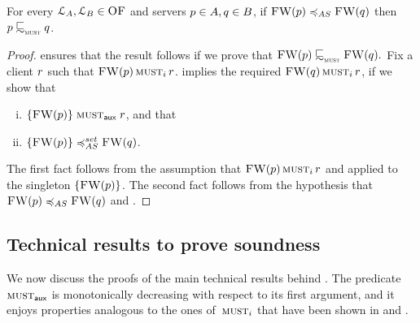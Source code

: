 \begin{proposition}[Soundness]
  \label{prop:bhv-soundness}
  For every $\mathcal{L}_A, \mathcal{L}_B \in \textsc{OF}$ and
  servers $p \in A, q \in B $,
  if $\liftFW{ \serverA } \asleq \liftFW{ \serverB }$ then $\serverA \testleqS \serverB$.
\end{proposition}
\begin{proof}
  ensures that the result follows if we prove that
$\liftFW{\serverA} \testleqS \liftFW{\serverB}.$
Fix a client $r$ such that $\textsc{FW}(p) \operatorname{\textsc{must}}_i r$.
 implies the required
$\textsc{FW}(q) \operatorname{\textsc{must}}_i r$, if we show that
\begin{enumerate}[(i)]
  \item $\{  \textsc{FW}(p)  \}  \mathrel{\operatorname{\textsc{must}}_{\textsf{aux}}}  r$, and that
  \item $\set{ \liftFW{ \serverA } } \mathrel{\preccurlyeq^{\mathsf{set}}_{\mathsf{AS}}} \liftFW{\serverB}$.
\end{enumerate}
The first fact follows from the assumption that $\textsc{FW}(p) \operatorname{\textsc{must}}_i r$
and  applied to the singleton
$\{ \textsc{FW}(p) \}$.
The second fact follows from the hypothesis that $\liftFW{ \serverA }
\asleq \liftFW{ \serverB }$ and .
\end{proof}

\subsection{Technical results to prove soundness}
\label{sec:appendix-soundness}

We now discuss the proofs of the main technical results
behind . The predicate $\operatorname{\textsc{must}}_{\textsf{aux}}$ is  monotonically decreasing with respect to its first
argument, and it enjoys properties analogous to the ones
of~$\operatorname{\textsc{must}}_i$ that have been shown in  and
.

